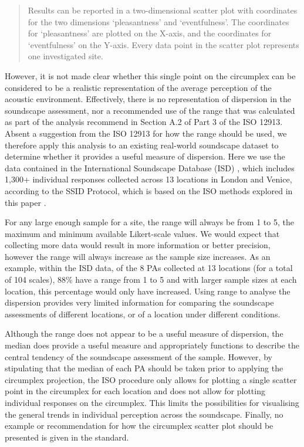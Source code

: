 \documentclass[
  authoryear,
  preprint,
  3p]{elsarticle}
\begin{document}
\begin{quote}
Results can be reported in a two-dimensional scatter plot with
coordinates for the two dimensions `pleasantness' and `eventfulness'.
The coordinates for `pleasantness' are plotted on the X-axis, and the
coordinates for `eventfulness' on the Y-axis. Every data point in the
scatter plot represents one investigated site.
\end{quote}

However, it is not made clear whether this single point on the
circumplex can be considered to be a realistic representation of the
average perception of the acoustic environment. Effectively, there is no
representation of dispersion in the soundscape assessment, nor a
recommended use of the range that was calculated as part of the analysis
recommend in Section A.2 of Part 3 of the ISO 12913. Absent a suggestion
from the ISO 12913 for how the range should be used, we therefore apply
this analysis to an existing real-world soundscape dataset to determine
whether it provides a useful measure of dispersion. Here we use the data
contained in the International Soundscape Database (ISD)
\citep{Mitchell2021International}, which includes 1,300+ individual
responses collected across 13 locations in London and Venice, according
to the SSID Protocol, which is based on the ISO methods explored in this
paper \citep{Mitchell2020Protocol}.

For any large enough sample for a site, the range will always be from 1
to 5, the maximum and minimum available Likert-scale values. We would
expect that collecting more data would result in more information or
better precision, however the range will always increase as the sample
size increases. As an example, within the ISD data, of the 8 PAs
collected at 13 locations (for a total of 104 scales), 88\% have a range
from 1 to 5 and with larger sample sizes at each location, this
percentage would only have increased. Using range to analyse the
dispersion provides very limited information for comparing the
soundscape assessments of different locations, or of a location under
different conditions.

Although the range does not appear to be a useful measure of dispersion,
the median does provide a useful measure and appropriately functions to
describe the central tendency of the soundscape assessment of the
sample. However, by stipulating that the median of each PA should be
taken prior to applying the circumplex projection, the ISO procedure
only allows for plotting a single scatter point in the circumplex for
each location and does not allow for plotting individual responses on
the circumplex. This limits the possibilities for visualising the
general trends in individual perception across the soundscape. Finally,
no example or recommendation for how the circumplex scatter plot should
be presented is given in the standard.
\end{document}
